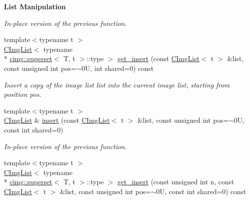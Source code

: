 \begin{Indent}{\bf List Manipulation}
\begin{DoxyCompactItemize}
\begin{DoxyCompactList}\small\item\em In-\/place version of the previous function. \end{DoxyCompactList}\item 
\hypertarget{structcimg__library_1_1_c_img_list_a0939ba5e1fd1cbc4cbfd149df81f72e2}{{\footnotesize template$<$typename t $>$ }\\\hyperlink{structcimg__library_1_1_c_img_list}{C\-Img\-List}$<$ typename \\*
\hyperlink{structcimg__library_1_1cimg_1_1superset}{cimg\-::superset}$<$ T, t $>$\-::type $>$ \hyperlink{structcimg__library_1_1_c_img_list_a0939ba5e1fd1cbc4cbfd149df81f72e2}{get\-\_\-insert} (const \hyperlink{structcimg__library_1_1_c_img_list}{C\-Img\-List}$<$ t $>$ \&list, const unsigned int pos=$\sim$0\-U, int shared=0) const }\label{structcimg__library_1_1_c_img_list_a0939ba5e1fd1cbc4cbfd149df81f72e2}

\begin{DoxyCompactList}\small\item\em Insert a copy of the image list {\ttfamily list} into the current image list, starting from position {\ttfamily pos}. \end{DoxyCompactList}\item 
\hypertarget{structcimg__library_1_1_c_img_list_a74d57a81a6e171fe9c33829e2f92aa9e}{{\footnotesize template$<$typename t $>$ }\\\hyperlink{structcimg__library_1_1_c_img_list}{C\-Img\-List} \& \hyperlink{structcimg__library_1_1_c_img_list_a74d57a81a6e171fe9c33829e2f92aa9e}{insert} (const \hyperlink{structcimg__library_1_1_c_img_list}{C\-Img\-List}$<$ t $>$ \&list, const unsigned int pos=$\sim$0\-U, const int shared=0)}\label{structcimg__library_1_1_c_img_list_a74d57a81a6e171fe9c33829e2f92aa9e}

\begin{DoxyCompactList}\small\item\em In-\/place version of the previous function. \end{DoxyCompactList}\item 
\hypertarget{structcimg__library_1_1_c_img_list_aebbfdcc702abf9d7a7e806dcc6e6da93}{{\footnotesize template$<$typename t $>$ }\\\hyperlink{structcimg__library_1_1_c_img_list}{C\-Img\-List}$<$ typename \\*
\hyperlink{structcimg__library_1_1cimg_1_1superset}{cimg\-::superset}$<$ T, t $>$\-::type $>$ \hyperlink{structcimg__library_1_1_c_img_list_aebbfdcc702abf9d7a7e806dcc6e6da93}{get\-\_\-insert} (const unsigned int n, const \hyperlink{structcimg__library_1_1_c_img_list}{C\-Img\-List}$<$ t $>$ \&list, const unsigned int pos=$\sim$0\-U, const int shared=0) const }\label{structcimg__library_1_1_c_img_list_aebbfdcc702abf9d7a7e806dcc6e6da93}


\end{DoxyCompactItemize}
\end{Indent}
